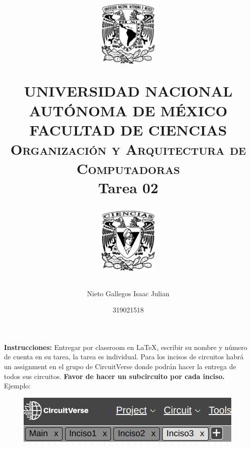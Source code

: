 \documentclass[12pt,letterpaper]{article}
\title{
		\vspace{-0.7in} 	
		\usefont{OT1}{bch}{b}{n}
		\begin{minipage}{3cm}
        \vspace{-0.5in} 	
    	\begin{center}
    		\includegraphics[height=3.2cm]{../logo_unam.png}
    	\end{center}
    \end{minipage}\hfill
    \begin{minipage}{10.7cm}
    
    	\begin{center}
\normalfont \normalsize \textsc{UNIVERSIDAD NACIONAL AUTÓNOMA DE MÉXICO \\ FACULTAD DE CIENCIAS \\ Organización y Arquitectura de Computadoras } \\
		\huge Tarea 02
    	\end{center}
     
    \end{minipage}\hfill
    \begin{minipage}{3.2cm}
    \vspace{-0.5in} 
    	\begin{center}
    		\includegraphics[height=3.2cm]{../logo_fc.png}
    	\end{center}
    \end{minipage}

\author{Nieto Gallegos Isaac Julian}
\date{319021518}
}
\begin{document}
\maketitle

\textbf{Instrucciones:} Entregar por classroom en \LaTeX, escribir su nombre y número de cuenta en su tarea, la tarea es individual. Para los incisos de circuitos habrá un assignment en el grupo de CircuitVerse donde podrán hacer la entrega de todos sus circuitos. \textbf{Favor de hacer un subcircuito por cada inciso.}\\

Ejemplo:
\begin{figure}[h]
    \centering
    \includegraphics[width=0.75\linewidth]{A.png}
\end{figure}

% 
% 

\end{document}
